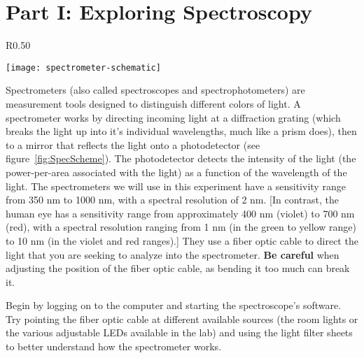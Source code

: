 \section*{Part I: Exploring Spectroscopy}
%
\begin{wrapfigure}{R}{0.50\textwidth}
  \vspace{-20pt}  
  \begin{center}
    \texttt{[image: spectrometer-schematic]}
  \end{center}
  \caption{Schematic of the internal operation of a spectrometer.}
  \label{fig:SpecScheme}
  \vspace{-5pt}
\end{wrapfigure}
Spectrometers (also called spectroscopes and spectrophotometers) are measurement tools designed to distinguish different colors of light. 
A spectrometer works by directing incoming light at a diffraction grating (which breaks the light up into it's individual wavelengths, much like a prism does), then to a mirror that reflects the light onto a photodetector (see figure~\ref{fig:SpecScheme}).
The photodetector detects the intensity of the light (the power-per-area associated with the light) as a function of the wavelength of the light. 
The spectrometers we will use in this experiment have a sensitivity range from 350 nm to 1000 nm, with a spectral resolution of 2 nm. 
[In contrast, the human eye has a sensitivity range from approximately 400 nm (violet) to 700 nm (red), with a spectral resolution ranging from 1 nm (in the green to yellow range) to 10 nm (in the violet and red ranges).] 
They use a fiber optic cable to direct the light that you are seeking to analyze into the spectrometer.
\textbf{Be careful} when adjusting the position of the fiber optic cable, as bending it too much can break it.
\par 
Begin by logging on to the computer and starting the spectroscope's software.
Try pointing the fiber optic cable at different available sources (the room lights or the various adjustable LEDs available in the lab) and using the light filter sheets to better understand how the spectrometer works.

